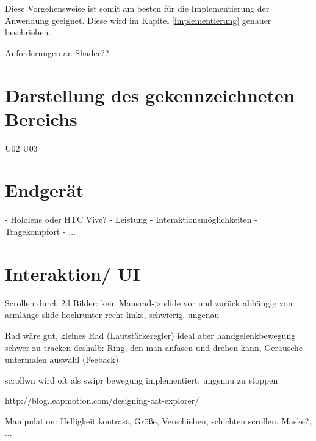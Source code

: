 Diese Vorgehensweise ist somit am besten für die Implementierung der Anwendung geeignet.
Diese wird im Kapitel \ref{implementierung} genauer beschrieben.

Anforderungen an Shader??


\section{Darstellung des gekennzeichneten Bereichs}


U02 U03  


\section{Endgerät}

- Hololens oder HTC Vive?
- Leistung
- Interaktionsmöglichkeiten
- Tragekompfort
- ...

\section{Interaktion/ UI } 


Scrollen durch 2d Bilder:
kein Mausrad-> slide vor und zurück abhängig von armlänge
slide hochrunter recht links, schwierig, ungenau

Rad wäre gut, kleines Rad (Lautstärkeregler) ideal
aber handgelenkbewegung schwer zu tracken
deshalb: Ring, den man anfasen und drehen kann, Geräusche untermalen auswahl (Feeback)

scrollwn wird oft als swipr bewegung implementiert: ungenau zu stoppen

http://blog.leapmotion.com/designing-cat-explorer/

Manipulation: Helligkeit kontrast, Größe, Verschieben, schichten scrollen, Maske?, ...

